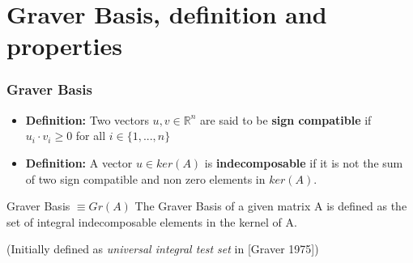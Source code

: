 \documentclass{beamer}
\begin{document}
    \section{Graver Basis, definition and properties}
    \begin{frame}
        \frametitle{Graver Basis}
        \begin{itemize}
            \item \textbf{Definition:} Two vectors $u,v \in \mathbb{R}^n$ are said to be \textbf{sign compatible} if $u_i \cdot v_i \geq 0$ for all $i \in \{1,...,n\}$
            \vspace{0.2cm}
            \item \textbf{Definition:} A vector $u \in ker(A)$ is \textbf{indecomposable} if it is not the sum of two sign compatible and non zero elements in $ker(A)$.
        \end{itemize}
        
        \vspace{1cm}
        \begin{block}{Graver Basis $\equiv Gr(A)$ }
            The Graver Basis of a given matrix A is defined as the set of integral indecomposable elements in the kernel of A.
        \end{block}
        (Initially defined as \textit{universal integral test set} in [Graver 1975])
    \end{frame}
    
\end{document}
